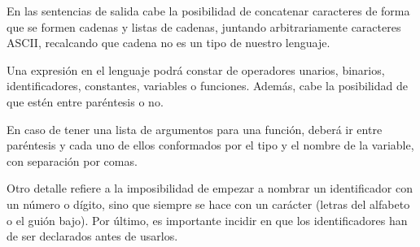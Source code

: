 En las sentencias de salida cabe la posibilidad de concatenar caracteres de forma que se formen cadenas y listas de cadenas, juntando arbitrariamente caracteres ASCII, recalcando que cadena no es un tipo de nuestro lenguaje.

Una expresión en el lenguaje podrá constar de operadores unarios, binarios, identificadores, constantes, variables o funciones. Además, cabe la posibilidad de que estén entre paréntesis o no.

En caso de tener una lista de argumentos para una función, deberá ir entre paréntesis y cada uno de ellos conformados por el tipo y el nombre de la variable, con separación por comas.

Otro detalle refiere a la imposibilidad de empezar a nombrar un identificador con un número o dígito, sino que siempre se hace con un carácter (letras del alfabeto o el guión bajo). Por último, es importante incidir en que los identificadores han de ser declarados antes de usarlos.
